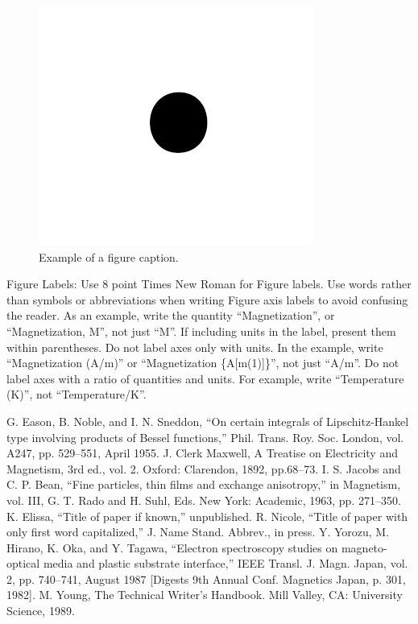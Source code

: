 \documentclass[conference]{IEEEtran}
\begin{document}
\begin{figure}[htbp]
\centerline{\includegraphics{fig1.png}}
\caption{Example of a figure caption.}
\label{fig}
\end{figure}

Figure Labels: Use 8 point Times New Roman for Figure labels. Use words 
rather than symbols or abbreviations when writing Figure axis labels to 
avoid confusing the reader. As an example, write the quantity 
``Magnetization'', or ``Magnetization, M'', not just ``M''. If including 
units in the label, present them within parentheses. Do not label axes only 
with units. In the example, write ``Magnetization (A/m)'' or ``Magnetization 
\{A[m(1)]\}'', not just ``A/m''. Do not label axes with a ratio of 
quantities and units. For example, write ``Temperature (K)'', not 
``Temperature/K''.

\begin{thebibliography}{00}
 G. Eason, B. Noble, and I. N. Sneddon, ``On certain integrals of Lipschitz-Hankel type involving products of Bessel functions,'' Phil. Trans. Roy. Soc. London, vol. A247, pp. 529--551, April 1955.
 J. Clerk Maxwell, A Treatise on Electricity and Magnetism, 3rd ed., vol. 2. Oxford: Clarendon, 1892, pp.68--73.
 I. S. Jacobs and C. P. Bean, ``Fine particles, thin films and exchange anisotropy,'' in Magnetism, vol. III, G. T. Rado and H. Suhl, Eds. New York: Academic, 1963, pp. 271--350.
 K. Elissa, ``Title of paper if known,'' unpublished.
 R. Nicole, ``Title of paper with only first word capitalized,'' J. Name Stand. Abbrev., in press.
 Y. Yorozu, M. Hirano, K. Oka, and Y. Tagawa, ``Electron spectroscopy studies on magneto-optical media and plastic substrate interface,'' IEEE Transl. J. Magn. Japan, vol. 2, pp. 740--741, August 1987 [Digests 9th Annual Conf. Magnetics Japan, p. 301, 1982].
 M. Young, The Technical Writer's Handbook. Mill Valley, CA: University Science, 1989.
\end{thebibliography}
\end{document}
